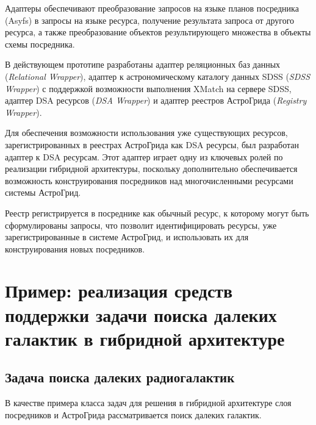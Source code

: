 \begin{multicols}{2}

 Адаптеры обеспечивают преобразование запросов на языке планов посредника
(Asyfs) в запросы на языке ресурса, получение результата запроса от другого ресурса, а
также преобразование объектов результирующего множества в объекты схемы
посредника.

     В действующем прототипе разработаны адаптер реляционных баз данных
(\textit{Relational Wrapper}), адап\-тер к астрономическому каталогу данных SDSS
(\textit{SDSS Wrapper}) с поддержкой возможности выполнения XMatch на сервере SDSS,
адаптер DSA ресурсов (\textit{DSA Wrapper}) и адаптер реестров АстроГрида
(\textit{Registry Wrapper}).

     Для обеспечения возможности использования уже существующих ресурсов,
зарегистрированных в реестрах АстроГрида как DSA ресурсы, был разработан адаптер к
DSA ресурсам. Этот адаптер играет одну из ключевых ролей по реализации гибридной
архитектуры, поскольку дополнительно обеспечивается возможность конструирования
посредников над многочисленными ресурсами системы АстроГрид.




     Реестр регистрируется в посреднике как обычный ресурс, к которому могут быть
сформулированы запросы, что позволит идентифицировать %
ресурсы, уже
зарегистрированные в системе Аст\-ро\-Грид, и использовать их для конструирования новых
посредников.

\section{Пример: реализация средств поддержки задачи поиска далеких галактик в
гибридной архитектуре}

\subsection{Задача поиска далеких радиогалактик}

     В качестве примера класса задач для решения в гибридной архитектуре слоя
посредников и АстроГрида рассматривается поиск далеких галактик.


\end{multicols}
